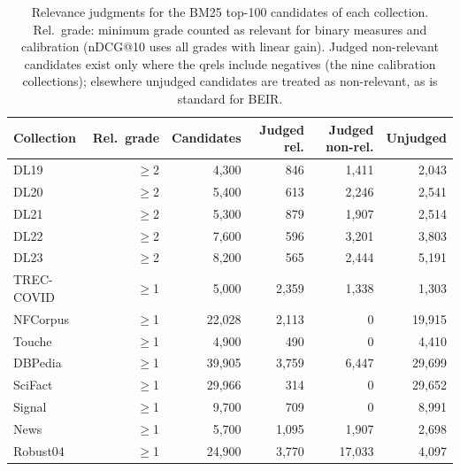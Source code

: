 \begin{table}[tp]
\centering
\scriptsize
\setlength{\tabcolsep}{3pt}
\caption{Relevance judgments for the BM25 top-100 candidates of each collection. Rel.\ grade: minimum grade counted as relevant for binary measures and calibration (nDCG@10 uses all grades with linear gain). Judged non-relevant candidates exist only where the qrels include negatives (the nine calibration collections); elsewhere unjudged candidates are treated as non-relevant, as is standard for BEIR.}
\label{tab:judged-counts}
\begin{tabular}{lrrrrr}
\toprule
Collection & Rel.\ grade & Candidates & Judged rel. & Judged non-rel. & Unjudged \\
\midrule
DL19 & $\ge$2 & 4{,}300 & 846 & 1{,}411 & 2{,}043 \\
DL20 & $\ge$2 & 5{,}400 & 613 & 2{,}246 & 2{,}541 \\
DL21 & $\ge$2 & 5{,}300 & 879 & 1{,}907 & 2{,}514 \\
DL22 & $\ge$2 & 7{,}600 & 596 & 3{,}201 & 3{,}803 \\
DL23 & $\ge$2 & 8{,}200 & 565 & 2{,}444 & 5{,}191 \\
TREC-COVID & $\ge$1 & 5{,}000 & 2{,}359 & 1{,}338 & 1{,}303 \\
NFCorpus & $\ge$1 & 22{,}028 & 2{,}113 & 0 & 19{,}915 \\
Touche & $\ge$1 & 4{,}900 & 490 & 0 & 4{,}410 \\
DBPedia & $\ge$1 & 39{,}905 & 3{,}759 & 6{,}447 & 29{,}699 \\
SciFact & $\ge$1 & 29{,}966 & 314 & 0 & 29{,}652 \\
Signal & $\ge$1 & 9{,}700 & 709 & 0 & 8{,}991 \\
News & $\ge$1 & 5{,}700 & 1{,}095 & 1{,}907 & 2{,}698 \\
Robust04 & $\ge$1 & 24{,}900 & 3{,}770 & 17{,}033 & 4{,}097 \\
\bottomrule
\end{tabular}
\end{table}
